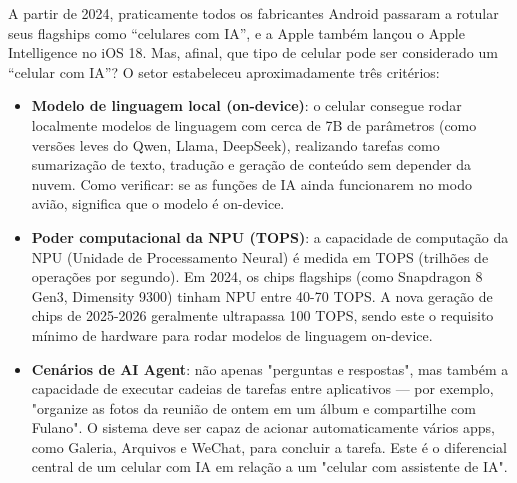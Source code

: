 


A partir de 2024, praticamente todos os fabricantes Android passaram a rotular seus flagships como “celulares com IA”, e a Apple também lançou o Apple Intelligence no iOS 18. Mas, afinal, que tipo de celular pode ser considerado um “celular com IA”? O setor estabeleceu aproximadamente três critérios:

\begin{itemize}
  \item \textbf{Modelo de linguagem local (on-device)}: o celular consegue rodar localmente modelos de linguagem com cerca de 7B de parâmetros (como versões leves do Qwen, Llama, DeepSeek), realizando tarefas como sumarização de texto, tradução e geração de conteúdo sem depender da nuvem. Como verificar: se as funções de IA ainda funcionarem no modo avião, significa que o modelo é on-device.
  \item \textbf{Poder computacional da NPU (TOPS)}: a capacidade de computação da NPU (Unidade de Processamento Neural) é medida em TOPS (trilhões de operações por segundo). Em 2024, os chips flagships (como Snapdragon 8 Gen3, Dimensity 9300) tinham NPU entre 40-70 TOPS. A nova geração de chips de 2025-2026 geralmente ultrapassa 100 TOPS, sendo este o requisito mínimo de hardware para rodar modelos de linguagem on-device.
  \item \textbf{Cenários de AI Agent}: não apenas "perguntas e respostas", mas também a capacidade de executar cadeias de tarefas entre aplicativos — por exemplo, "organize as fotos da reunião de ontem em um álbum e compartilhe com Fulano". O sistema deve ser capaz de acionar automaticamente vários apps, como Galeria, Arquivos e WeChat, para concluir a tarefa. Este é o diferencial central de um celular com IA em relação a um "celular com assistente de IA".
\end{itemize}

